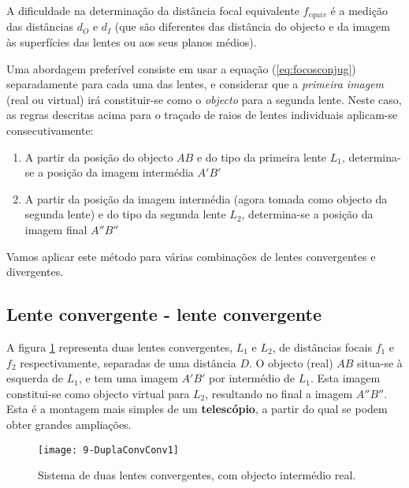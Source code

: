 \documentclass[a4paper,12pt]{article}      %
\begin{document}
A dificuldade
na determinação da distância focal equivalente ${f_{equiv}}$ é a medição das distâncias $d_O$ e $d_I$ 
(que são diferentes das distância do objecto e da imagem às superfícies das lentes ou aos seus planos médios).

Uma abordagem preferível consiste em usar a equação (\ref{eq:focosconjug}) separadamente para cada uma das lentes, e considerar que a \emph{primeira imagem} (real ou virtual) irá constituir-se como o \emph{objecto} para a segunda lente. Neste caso, as regras descritas acima para o traçado de raios de lentes individuais aplicam-se consecutivamente:
\begin{enumerate}
\item  A partir da posição do objecto $AB$ e do tipo da primeira lente $L_1$, determina-se a posição da imagem intermédia $A'B'$
\item  A partir da posição da imagem intermédia (agora tomada como objecto da segunda lente) e do tipo da segunda lente $L_2$, determina-se a posição da imagem final $A''B''$
\end{enumerate}
Vamos aplicar este método para várias combinações de lentes convergentes e divergentes.

\subsection{\sf Lente convergente - lente convergente}
A figura \ref{fig:DuplaConvConv1} representa duas lentes convergentes, $L_1$ e $L_2$, de distâncias focais $f_1$ e $f_2$ respectivamente, separadas de uma distância $D$. O objecto (real) $AB$ situa-se à esquerda de $L_1$, e tem uma imagem $A'B'$ por intermédio de $L_1$. Esta imagem constitui-se como objecto virtual para $L_2$, resultando no final a imagem $A''B''$. Esta é a montagem mais simples de um \textbf{telescópio}, a partir do qual se podem obter grandes ampliações.

\begin{figure}	[!htb]  \centering 
	\texttt{[image: 9-DuplaConvConv1]}
	\caption{Sistema de duas lentes convergentes, com objecto intermédio real. \label{fig:DuplaConvConv1}} 
\end{figure}

\end{document}
